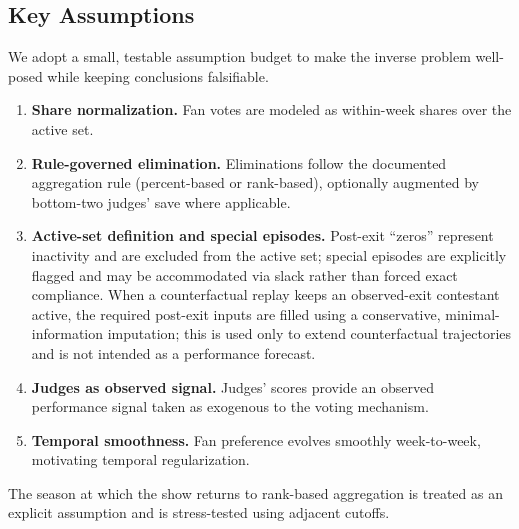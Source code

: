 \subsection{Key Assumptions}\label{subsec:assumptions}

We adopt a small, testable assumption budget to make the inverse problem well-posed while keeping conclusions falsifiable.
\begin{enumerate}
    \item \textbf{Share normalization.} Fan votes are modeled as within-week shares over the active set.
    \item \textbf{Rule-governed elimination.} Eliminations follow the documented aggregation rule (percent-based or rank-based), optionally augmented by bottom-two judges' save where applicable.
    \item \textbf{Active-set definition and special episodes.} Post-exit ``zeros'' represent inactivity and are excluded from the active set; special episodes are explicitly flagged and may be accommodated via slack rather than forced exact compliance. When a counterfactual replay keeps an observed-exit contestant active, the required post-exit inputs are filled using a conservative, minimal-information imputation; this is used only to extend counterfactual trajectories and is not intended as a performance forecast.
    \item \textbf{Judges as observed signal.} Judges' scores provide an observed performance signal taken as exogenous to the voting mechanism.
    \item \textbf{Temporal smoothness.} Fan preference evolves smoothly week-to-week, motivating temporal regularization.
\end{enumerate}
The season at which the show returns to rank-based aggregation is treated as an explicit assumption and is stress-tested using adjacent cutoffs.

